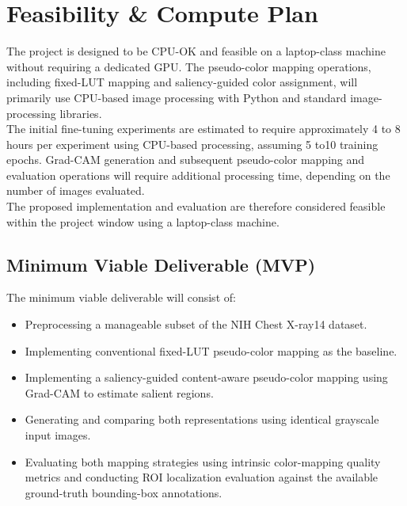 \documentclass[11pt]{article}
\begin{document}

\section{Feasibility \& Compute Plan}
\label{sec:feasibility}

The project is designed to be CPU-OK and feasible on a laptop-class machine without requiring a dedicated GPU. The pseudo-color mapping operations, including fixed-LUT mapping and saliency-guided color assignment, will primarily use CPU-based image processing with Python and standard image-processing libraries. \\

The initial fine-tuning experiments are estimated to require approximately 4 to 8 hours per experiment using CPU-based processing, assuming 5 to10 training epochs. Grad-CAM generation and subsequent pseudo-color mapping and evaluation operations will require additional processing time, depending on the number of images evaluated.\\

The proposed implementation and evaluation are therefore considered feasible within the project window using a laptop-class machine.


\subsection{Minimum Viable Deliverable (MVP)}

The minimum viable deliverable will consist of:
\begin{itemize}[leftmargin=*]

    \item Preprocessing a manageable subset of the NIH Chest X-ray14 dataset.
    \item Implementing conventional fixed-LUT pseudo-color mapping as the baseline.
    \item Implementing a saliency-guided content-aware pseudo-color mapping using Grad-CAM to estimate salient regions.
    \item Generating and comparing both representations using identical grayscale input images.
    \item Evaluating both mapping strategies using intrinsic color-mapping quality metrics and conducting ROI localization evaluation against the available ground-truth bounding-box annotations.
\end{itemize}
\end{document}
